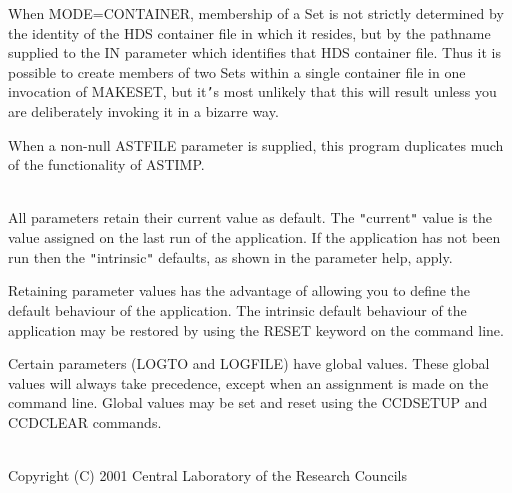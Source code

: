 \documentclass[twoside,11pt]{article}
\newcommand{\htmlref}[2]{#1}
\renewcommand{\_}{\texttt{\symbol{95}}}
\newcommand{\routine}[1]{{\sc #1}}
\newcommand{\xroutine}[1]{\htmlref{{\sc #1}}{#1}}
\newcommand{\sstdiytopic}[2]{\item[#1:] \mbox{} \\[1.3ex] #2}
\newcommand{\sstitem}{\item}
\newcommand{\sstdiytopic}[2]{\item[{#1}] #2 }
\newcommand{\sstitem}{\item}
\begin{document}
{{{         \sstitem
         When MODE=CONTAINER, membership of a Set is not strictly
         determined by the identity of the HDS container file in which
         it resides, but by the pathname supplied to the IN parameter
         which identifies that HDS container file.  Thus it is possible
         to create members of two Sets within a single container file
         in one invocation of \routine{MAKESET}, but it{\tt '}s most unlikely that this
         will result unless you are deliberately invoking it in a
         bizarre way.

         \sstitem
         When a non-null ASTFILE parameter is supplied, this program
         duplicates much of the functionality of \xroutine{ASTIMP}.
      }
   }
   \sstdiytopic{
      Behaviour of Parameters
   }{
      All parameters retain their current value as default. The
      {\tt "}current{\tt "} value is the value assigned on the last run of the
      application. If the application has not been run then the
      {\tt "}intrinsic{\tt "} defaults, as shown in the parameter help, apply.

      Retaining parameter values has the advantage of allowing you to
      define the default behaviour of the application. The intrinsic
      default behaviour of the application may be restored by using the
      RESET keyword on the command line.

      Certain parameters (LOGTO and LOGFILE) have global
      values. These global values will always take precedence, except
      when an assignment is made on the command line. Global values may
      be set and reset using the \xroutine{CCDSETUP} and \xroutine{CCDCLEAR} commands.
   }
   \sstdiytopic{
      Copyright
   }{
      Copyright (C) 2001 Central Laboratory of the Research Councils
   }
}
\end{document}
